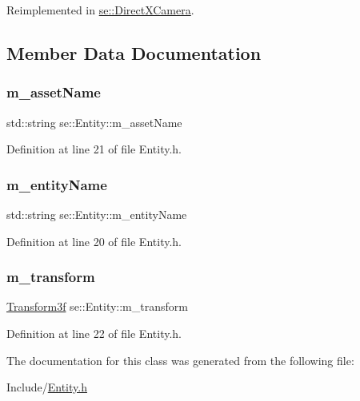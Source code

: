 Reimplemented in \mbox{\hyperlink{classse_1_1_direct_x_camera_ae313a5d5a4d2c1b88e5f40285b31b921}{se\+::\+Direct\+X\+Camera}}.



\subsection{Member Data Documentation}
\mbox{\label{classse_1_1_entity_aba1f7cc3700caee65b20c423185ab7ca}} 
\subsubsection{\texorpdfstring{m\+\_\+asset\+Name}{m\_assetName}}
{\footnotesize\ttfamily std\+::string se\+::\+Entity\+::m\+\_\+asset\+Name\hspace{0.3cm}{\ttfamily [protected]}}



Definition at line 21 of file Entity.\+h.

\mbox{\label{classse_1_1_entity_ad4e3cc82e88be87565d00fdf10c18b12}} 
\subsubsection{\texorpdfstring{m\+\_\+entity\+Name}{m\_entityName}}
{\footnotesize\ttfamily std\+::string se\+::\+Entity\+::m\+\_\+entity\+Name\hspace{0.3cm}{\ttfamily [protected]}}



Definition at line 20 of file Entity.\+h.

\mbox{\label{classse_1_1_entity_a85a408963ce0920c7bc3bfec29266238}} 
\subsubsection{\texorpdfstring{m\+\_\+transform}{m\_transform}}
{\footnotesize\ttfamily \mbox{\hyperlink{classse_1_1_transform3f}{Transform3f}} se\+::\+Entity\+::m\+\_\+transform\hspace{0.3cm}{\ttfamily [protected]}}



Definition at line 22 of file Entity.\+h.



The documentation for this class was generated from the following file\+:\begin{DoxyCompactItemize}
\item 
Include/\mbox{\hyperlink{_entity_8h}{Entity.\+h}}\end{DoxyCompactItemize}
